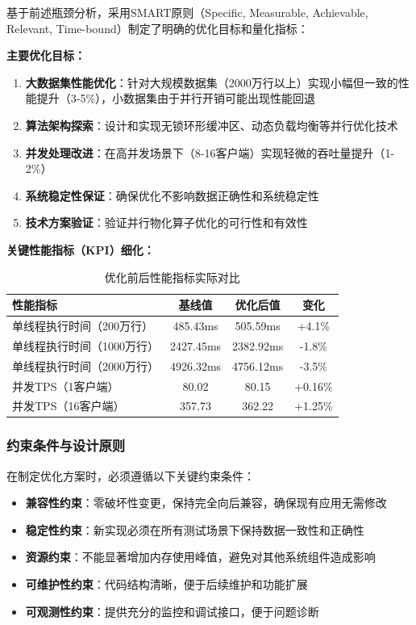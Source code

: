 基于前述瓶颈分析，采用SMART原则（Specific, Measurable, Achievable, Relevant, Time-bound）制定了明确的优化目标和量化指标：

\textbf{主要优化目标：}
\begin{enumerate}[topsep = 0 pt, itemsep= 0 pt, parsep=0pt, partopsep=0pt, leftmargin=44pt, itemindent=0pt, labelsep=6pt, label=(\arabic*)]
    \item \textbf{大数据集性能优化}：针对大规模数据集（2000万行以上）实现小幅但一致的性能提升（3-5\%），小数据集由于并行开销可能出现性能回退
    \item \textbf{算法架构探索}：设计和实现无锁环形缓冲区、动态负载均衡等并行优化技术
    \item \textbf{并发处理改进}：在高并发场景下（8-16客户端）实现轻微的吞吐量提升（1-2\%）
    \item \textbf{系统稳定性保证}：确保优化不影响数据正确性和系统稳定性
    \item \textbf{技术方案验证}：验证并行物化算子优化的可行性和有效性
\end{enumerate}

\textbf{关键性能指标（KPI）细化：}

\begin{table}[htbp]
\centering
\caption{优化前后性能指标实际对比}
\begin{tabular}{|l|c|c|c|}
\hline
\textbf{性能指标} & \textbf{基线值} & \textbf{优化后值} & \textbf{变化} \\
\hline
单线程执行时间（200万行） & 485.43ms & 505.59ms & +4.1\% \\
单线程执行时间（1000万行） & 2427.45ms & 2382.92ms & -1.8\% \\
单线程执行时间（2000万行） & 4926.32ms & 4756.12ms & -3.5\% \\
并发TPS（1客户端） & 80.02 & 80.15 & +0.16\% \\
并发TPS（16客户端） & 357.73 & 362.22 & +1.25\% \\
\hline
\end{tabular}
\end{table}

\subsubsection{约束条件与设计原则}

在制定优化方案时，必须遵循以下关键约束条件：

\begin{itemize}
    \item \textbf{兼容性约束}：零破坏性变更，保持完全向后兼容，确保现有应用无需修改
    \item \textbf{稳定性约束}：新实现必须在所有测试场景下保持数据一致性和正确性
    \item \textbf{资源约束}：不能显著增加内存使用峰值，避免对其他系统组件造成影响
    \item \textbf{可维护性约束}：代码结构清晰，便于后续维护和功能扩展
    \item \textbf{可观测性约束}：提供充分的监控和调试接口，便于问题诊断
\end{itemize}

